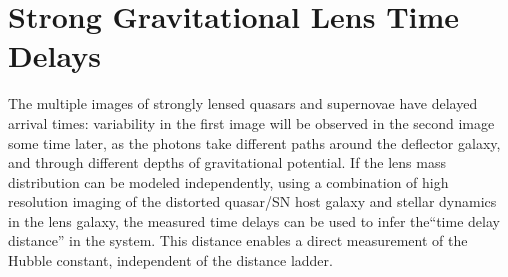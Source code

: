 %
%
%
%
%
%
%
\clearpage
\section{ Strong Gravitational Lens Time Delays }
\def\secname{lenstimedelays}\label{sec:\secname}




The multiple images of strongly lensed quasars and supernovae have
delayed arrival times: variability in the first image will be observed
in the second image some time later, as the photons take different
paths around the deflector galaxy, and through different depths of
gravitational potential. If the lens mass distribution can be modeled
independently, using a combination of high resolution imaging of the
distorted quasar/SN host galaxy and stellar dynamics in the lens
galaxy, the measured time delays can be used to infer the``time delay
distance'' in the system. This distance enables a direct measurement
of the Hubble constant, independent of the distance ladder.

